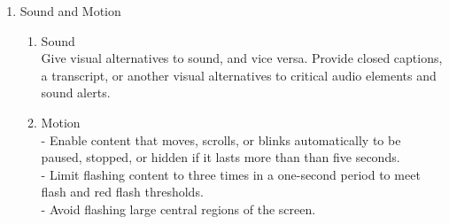 \documentclass[12pt]{article}
\begin{document}
{{\begin{enumerate}
\begin{enumerate}
\begin{enumerate}
       \end{enumerate}
       \item{For users who are colorblind, or cannot see differences in color, include design elements in addition to color that ensure they receive the same amount of information. Use multiple visual cues to communicate important states. Use elements such as strokes, indicators, patterns, texture, or text to describe actions and content.}
     \end{enumerate}
    \item{Sound and Motion}
    	\begin{enumerate}
        	\item{Sound\\Give visual alternatives to sound, and vice versa. Provide closed captions, a transcript, or another visual alternatives to critical audio elements and sound alerts.}
            \item{Motion\\- Enable content that moves, scrolls, or blinks automatically to be paused, stopped, or hidden if it lasts more than than five seconds.\\
- Limit flashing content to three times in a one-second period to meet flash and red flash thresholds.\\
- Avoid flashing large central regions of the screen.}
        \end{enumerate}


\end{enumerate}}}
\end{document}

